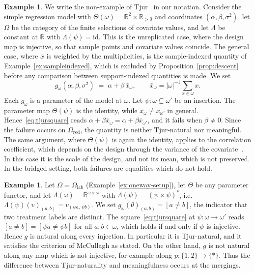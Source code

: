 \documentclass[11pt,a4paper]{article}
\theoremstyle{plain}
\theoremstyle{definition}
\newtheorem{example}[theorem]{Example}
\theoremstyle{remark}
\newcommand{\cat}[1]{\mathsf{#1}}
\newcommand{\catO}{\cat{\Omega}}
\newcommand{\id}{\mathrm{id}}
\newcommand{\R}{\mathbb{R}}
\begin{document}
\begin{example}\label{ex:alphabetaxbar}
We write the non-example of
Tjur~\cite[pp.~1299--1300]{tjur_discussion_2002} in our notation. Consider the
simple regression model with $\Theta(\omega) = \R^2 \times \R_{>0}$ and
coordinates $(\alpha,\beta,\sigma^2)$, let $\catO$ be the category of the
finite selections of covariate values, and let $\Lambda$ be constant at $\R$
with $\Lambda(\psi) = \id$. This is the unreplicated case, where the design
map is injective, so that sample points and covariate values coincide. The
general case, where $\bar x$ is weighted by the multiplicities, is the
sample-indexed quantity of Example~\ref{ex:sampleindexed}, which is excluded by
Proposition~\ref{prop:descent} before any comparison between support-indexed
quantities is made. We set
\[
g_{\omega}(\alpha,\beta,\sigma^2) \;=\; \alpha + \beta\,\bar x_{\omega},
\qquad
\bar x_{\omega} = |\omega|^{-1}\textstyle\sum_{x \in \omega} x .
\]
Each $g_\omega$ is a parameter of the model at $\omega$. Let
$\psi \colon \omega \subsetneq \omega'$ be an insertion. The parameter map
$\Theta(\psi)$ is the identity, while $\bar x_\omega \neq \bar x_{\omega'}$ in
general. Hence~\eqref{eq:tjursquare} reads
$\alpha + \beta\bar x_{\omega} = \alpha + \beta\bar x_{\omega'}$, and it fails
when $\beta \neq 0$. Since the failure occurs on $\catO_{\mathrm{red}}$, the
quantity is neither Tjur-natural nor meaningful. The same argument, where
$\Theta(\psi)$ is again the identity, applies to the correlation coefficient,
which depends on the design through the variance of the
covariate~\cite[\S6.2]{mccullagh_what_2002}. In this case it is the scale of
the design, and not its mean, which is not preserved. In the bridged setting,
both failures are equalities which do not hold.
\end{example}

\begin{example}\label{ex:tjurgap}
Let $\catO = \catO_{\mathrm{lab}}$ (Example~\ref{ex:oneway-setup}), let
$\Theta$ be any parameter functor, and let
$\Lambda(\omega) = \R^{\omega \times \omega}$ with
$\Lambda(\psi) = (\psi\times\psi)^{*}$, i.e.\
$\Lambda(\psi)(v)_{(a,b)} = v_{(\psi a,\,\psi b)}$. We set
$g_\omega(\theta)_{(a,b)} = [a \neq b]$, the indicator that two treatment
labels are distinct. The square~\eqref{eq:tjursquare} at
$\psi \colon \omega \to \omega'$ reads $[a \neq b] = [\psi a \neq \psi b]$ for
all $a,b \in \omega$, which holds if and only if $\psi$ is injective. Hence
$g$ is natural along every injection. In particular it is Tjur-natural, and it
satisfies the criterion of McCullagh as stated. On the other hand, $g$ is not
natural along any map which is not injective, for example along
$p \colon \{1,2\} \to \{*\}$. Thus the difference between Tjur-naturality and
meaningfulness occurs at the mergings.
\end{example}
\end{document}
